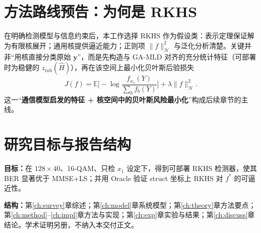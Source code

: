 \section{方法路线预告：为何是 RKHS}

在明确检测模型与信息约束后，本工作选择 RKHS 作为假设类\cite{aronszajn1950,schafer2006,steinwart2008}：表示定理保证解为有限核展开；通用核提供逼近能力；正则项 $\|f\|_{\mathcal{H}}^2$ 与泛化分析清楚。关键并非“用核直接分类原始 $\mathbf{y}$”，而是先构造与 GA-MLD 对齐的充分统计特征（可部署时为稳健的 $z_{\mathrm{rob}}(\hat H)$），再在该空间上最小化贝叶斯后验损失
\begin{equation}
J(f)=\mathbb{E}\Big[-\log\frac{f_{x_1}(Y)}{\sum_b f_b(Y)}\Big]+\lambda\|f\|_{\mathcal{H}}^2.
\end{equation}
这一“\textbf{通信模型启发的特征 + 核空间中的贝叶斯风险最小化}”构成后续章节的主线。

\section{研究目标与报告结构}

\noindent\textbf{目标：}在 $128\times40$、16-QAM、只检 $x_1$ 设定下，得到可部署 RKHS 检测器，使其 BER 显著优于 MMSE+LS；并用 Oracle 验证 struct 坐标上 RKHS 对 $f^*$ 的可逼近性。

\noindent\textbf{结构：}第\ref{ch:survey}章综述；第\ref{ch:model}章系统模型；第\ref{ch:theory}章方法要点；第\ref{ch:method}--\ref{ch:impl}章方法与实现；第\ref{ch:exp}章实验与结果；第\ref{ch:discuss}章结论。学术证明另册，不纳入本交付正文。
